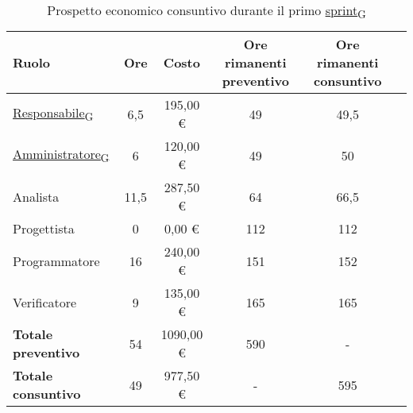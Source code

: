 \begin{table}[!h]
	\centering
	\begin{tabular}{ | l | c | c | c | c | c | }
		\hline
		\textbf{Ruolo}             & \textbf{Ore} & \textbf{Costo} & \textbf{Ore rimanenti preventivo} & \textbf{Ore rimanenti consuntivo} \\
		\hline
		\href{https://7last.github.io/docs/rtb/documentazione-interna/glossario\#responsabile}{Responsabile\textsubscript{G}}               & 6,5          & 195,00 €       & 49                                & 49,5                              \\
		\href{https://7last.github.io/docs/rtb/documentazione-interna/glossario\#amministratore}{Amministratore\textsubscript{G}}             & 6            & 120,00 €       & 49                                & 50                                \\
		Analista                   & 11,5         & 287,50 €       & 64                                & 66,5                              \\
		Progettista                & 0            & 0,00 €         & 112                               & 112                               \\
		Programmatore              & 16           & 240,00 €       & 151                               & 152                               \\
		Verificatore               & 9            & 135,00 €       & 165                               & 165                               \\
		\hline
		\textbf{Totale preventivo} & 54           & 1090,00 €      & 590                               & -                                 \\
		\hline
		\textbf{Totale consuntivo} & 49           & 977,50 €       & -                                 & 595                               \\
		\hline
	\end{tabular}
	\caption{Prospetto economico consuntivo durante il primo \href{https://7last.github.io/docs/rtb/documentazione-interna/glossario\#sprint}{sprint\textsubscript{G}}}
	
\end{table}

